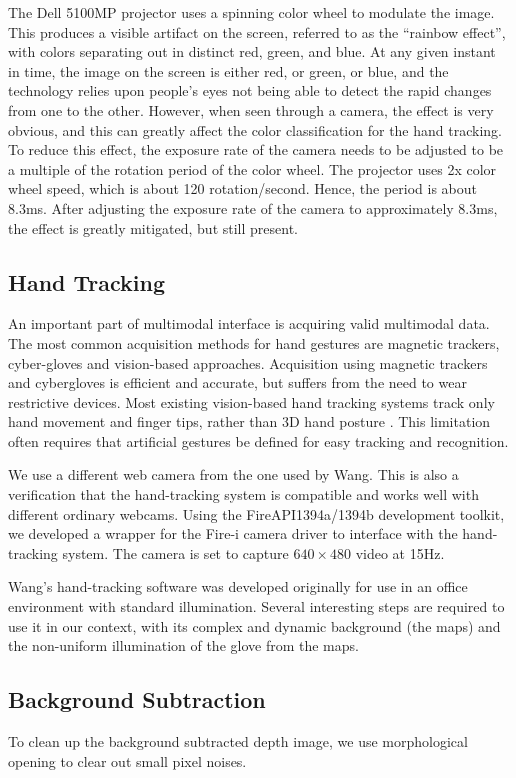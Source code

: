 The Dell 5100MP projector uses a spinning color wheel to modulate the image. This produces a visible artifact on the screen, referred to as the ``rainbow effect'', with colors separating out in distinct red, green, and blue. At any given instant in time, the image on the screen is either red, or green, or blue, and the technology relies upon people's eyes not being able to detect the rapid changes from one to the other. However, when seen through a camera, the effect is very obvious, and this can greatly affect the color classification for the hand tracking. To reduce this effect, the exposure rate of the camera needs to be adjusted to be a multiple of the rotation period of the color wheel. The projector uses 2x color wheel speed, which is about 120 rotation/second. Hence, the period is about 8.3ms. After adjusting the exposure rate of the camera to approximately 8.3ms, the effect is greatly mitigated, but still present. 

\subsection{Hand Tracking}
An important part of multimodal interface is acquiring valid multimodal data. The most common acquisition methods for hand gestures are magnetic trackers, cyber-gloves and vision-based approaches. Acquisition using magnetic trackers and cybergloves is efficient and accurate, but suffers from the need to wear restrictive devices. Most existing vision-based hand tracking systems track only hand movement and finger tips, rather than 3D hand posture \cite{Demirdjian03}\cite{Oka02}\cite{Rauschert02}. This limitation often requires that artificial gestures be defined for easy tracking and recognition.  

We use a different web camera from the one used by Wang. This is also a verification that the hand-tracking system is compatible and works well with different ordinary webcams. Using the FireAPI\texttrademark 1394a/1394b development toolkit, we developed a wrapper for the Fire-i camera driver to interface with the hand-tracking system. The camera is set to capture $640 \times 480$ video at 15Hz.  

Wang's hand-tracking software was developed originally for use in an office environment with standard illumination. Several interesting steps are required to use it in our context, with its complex and dynamic background (the maps) and the non-uniform illumination of the glove from the maps. 

\subsection{Background Subtraction}
To clean up the background subtracted depth image, we use morphological opening
to clear out small pixel noises. 

